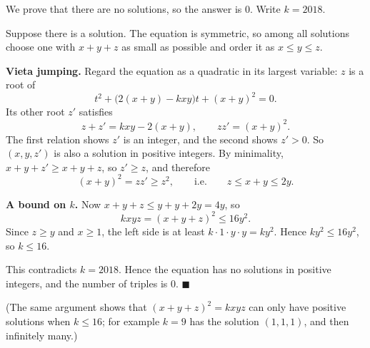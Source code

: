 We prove that there are no solutions, so the answer is $\boxed{0}$. Write $k=2018$.

Suppose there is a solution. The equation is symmetric, so among all solutions choose one with $x+y+z$ as small as possible and order it as $x\le y\le z$.

\textbf{Vieta jumping.} Regard the equation as a quadratic in its largest variable: $z$ is a root of
\[
t^2+\bigl(2(x+y)-kxy\bigr)t+(x+y)^2=0 .
\]
Its other root $z'$ satisfies
\[
z+z'=kxy-2(x+y),\qquad zz'=(x+y)^2 .
\]
The first relation shows $z'$ is an integer, and the second shows $z'>0$. So $(x,y,z')$ is also a solution in positive integers. By minimality, $x+y+z'\ge x+y+z$, so $z'\ge z$, and therefore
\[
(x+y)^2=zz'\ge z^2,\qquad\text{i.e.}\qquad z\le x+y\le 2y .
\]

\textbf{A bound on $k$.} Now $x+y+z\le y+y+2y=4y$, so
\[
kxyz=(x+y+z)^2\le16y^2 .
\]
Since $z\ge y$ and $x\ge1$, the left side is at least $k\cdot1\cdot y\cdot y=ky^2$. Hence $ky^2\le16y^2$, so $k\le16$.

This contradicts $k=2018$. Hence the equation has no solutions in positive integers, and the number of triples is $\boxed{0}$. $\blacksquare$

(The same argument shows that $(x+y+z)^2=kxyz$ can only have positive solutions when $k\le16$; for example $k=9$ has the solution $(1,1,1)$, and then infinitely many.)
